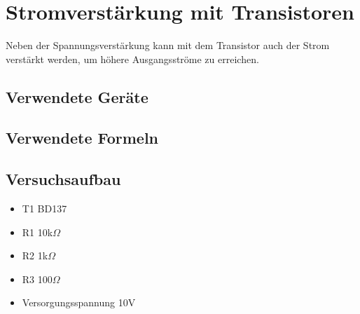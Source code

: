 \documentclass[12pt,a4paper]{article}
\begin{document}
\section{Stromverstärkung mit Transistoren}
Neben der Spannungsverstärkung kann mit dem Transistor auch der Strom verstärkt werden, um höhere Ausgangsströme zu erreichen.
\subsection{Verwendete Geräte}
\subsection{Verwendete Formeln}
\subsection{Versuchsaufbau}

\begin{itemize}
\item	T1 BD137

\item	R1 10k$\Omega$

\item	R2 1k$\Omega$

\item	R3 100$\Omega$

\item	Versorgungsspannung 10V

\end{itemize}
\end{document}
